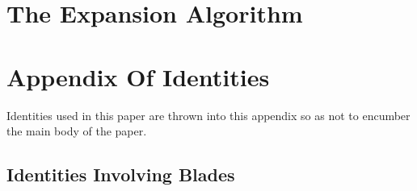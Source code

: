 \documentclass{birkjour}
\theoremstyle{definition}
\theoremstyle{remark}
\numberwithin{equation}{section}
\begin{document}
\section{The Expansion Algorithm}








\section{Appendix Of Identities}

Identities used in this paper are thrown into this appendix so as not to encumber the main body of the paper.

\subsection{Identities Involving Blades}
\end{document}
